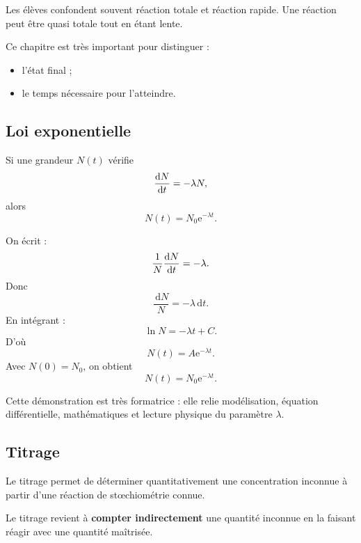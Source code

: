 \documentclass[11pt,a4paper]{article}
\newcommand{\dd}{\,\mathrm{d}}
\newcommand{\e}{\mathrm{e}}
\begin{document}
\begin{fausseintuition}
Les élèves confondent souvent réaction totale et réaction rapide.
Une réaction peut être quasi totale tout en étant lente.
\end{fausseintuition}

\begin{modele}
Ce chapitre est très important pour distinguer :
\begin{itemize}
    \item l'état final ;
    \item le temps nécessaire pour l'atteindre.
\end{itemize}
\end{modele}

\subsection{Loi exponentielle}

\begin{bilan}
Si une grandeur \(N(t)\) vérifie
\[
\dv{N}{t}=-\lambda N,
\]
alors
\[
N(t)=N_0\e^{-\lambda t}.
\]
\end{bilan}

\begin{demo}
On écrit :
\[
\frac{1}{N}\dv{N}{t}=-\lambda.
\]
Donc
\[
\frac{\dd N}{N}=-\lambda \dd t.
\]
En intégrant :
\[
\ln N = -\lambda t + C.
\]
D'où
\[
N(t)=A\e^{-\lambda t}.
\]
Avec \(N(0)=N_0\), on obtient
\[
N(t)=N_0\e^{-\lambda t}.
\]
\end{demo}

\begin{idee}
Cette démonstration est très formatrice :
elle relie modélisation, équation différentielle, mathématiques et lecture physique du paramètre \(\lambda\).
\end{idee}

\subsection{Titrage}

\begin{sens}
Le titrage permet de déterminer quantitativement une concentration inconnue
à partir d'une réaction de stœchiométrie connue.
\end{sens}

\begin{imagem}
Le titrage revient à \textbf{compter indirectement} une quantité inconnue
en la faisant réagir avec une quantité maîtrisée.
\end{imagem}
\end{document}
